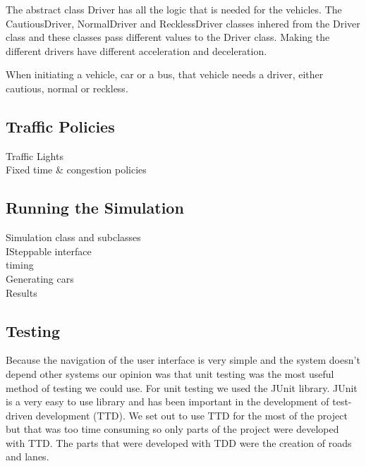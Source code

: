 \documentclass[11pt]{article}
\begin{document}
The abstract class Driver has all the logic that is needed for the vehicles. The CautiousDriver, NormalDriver and RecklessDriver classes inhered from the Driver class and these classes pass different values to the Driver class. Making the different drivers have different acceleration and deceleration.

When initiating a vehicle, car or a bus, that vehicle needs a driver, either cautious, normal or reckless.

\subsection{Traffic Policies}

Traffic Lights
\\
Fixed time \& congestion policies

\subsection{Running the Simulation}

Simulation class and subclasses
\\
ISteppable interface
\\
timing
\\
Generating cars
\\
Results

\subsection{Testing}
Because the navigation of the user interface is very simple and the system doesn't depend other systems our opinion was that unit testing was the most useful method of testing we could use. For unit testing we used the JUnit library. JUnit is a very easy to use library and has been important in the development of test-driven development (TTD). We set out to use TTD for the most of the project but that was too time consuming so only parts of the project were developed with TTD. The parts that were developed with TDD were the creation of roads and lanes.
\end{document}
